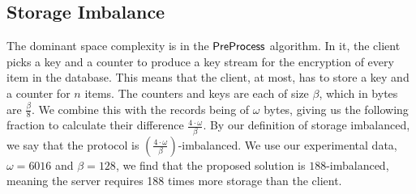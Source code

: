 \subsection*{\thesubsection\quad Storage Imbalance}\label{subsec:DiscussionStorageImbalanced}

The dominant space complexity is in the $ \mathsf{{PreProcess}} $ algorithm. In it, the client picks a key and a counter to produce a key stream for the encryption of every item in the database. This means that the client, at most, has to store a key and a counter for $ n $ items. The counters and keys are each of size $ \beta $, which in bytes are $ \frac{\beta}{8} $. We combine this with the records being of $ \omega $ bytes, giving us the following fraction to calculate their difference $ \frac{4 \cdot \omega}{\beta} $. By our definition of storage imbalanced, we say that the protocol is $ (\frac{4 \cdot \omega}{\beta}) $-imbalanced. We use our experimental data, $ \omega = 6016 $ and $ \beta = 128 $, we find that the proposed solution is $ 188 $-imbalanced, meaning the server requires 188 times more storage than the client.
